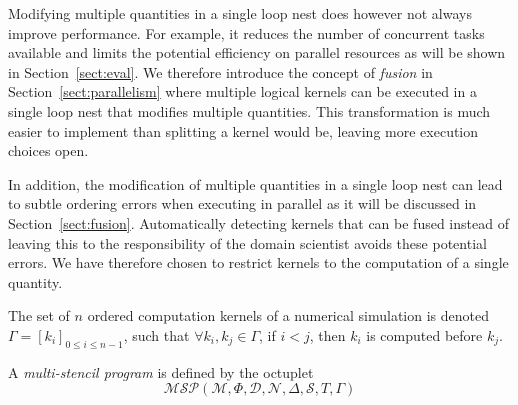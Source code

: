 Modifying multiple quantities in a single loop nest does however not always improve performance.
For example, it reduces the number of concurrent tasks available and limits the potential efficiency on parallel resources as will be shown in Section~\ref{sect:eval}.
We therefore introduce the concept of \emph{fusion} in Section~\ref{sect:parallelism} where multiple logical kernels can be executed in a single loop nest that modifies multiple quantities.
This transformation is much easier to implement than splitting a kernel would be, leaving more execution choices open.

In addition, the modification of multiple quantities in a single loop nest can lead to subtle ordering errors when executing in parallel as it will be discussed in Section~\ref{sect:fusion}.
Automatically detecting kernels that can be fused instead of leaving this to the responsibility of the domain scientist avoids these potential errors.
We have therefore chosen to restrict kernels to the computation of a single quantity.


\begin{mydef}
The set of $n$ ordered computation kernels of a numerical simulation is denoted $\Gamma = [k_i]_{0 \leq i \leq n-1}$, such that $\forall k_i,k_j \in \Gamma$, if $i < j$, then $k_i$ is computed before $k_j$.
\end{mydef}

\begin{mydef}
A \textit{multi-stencil program} is defined by the octuplet 
\begin{equation}
\mathcal{MSP}(\mathcal{M},\Phi,\mathcal{D},\mathcal{N},\Delta, \mathcal{S},T,\Gamma)
\label{eq:msp}
\end{equation}
\end{mydef}

